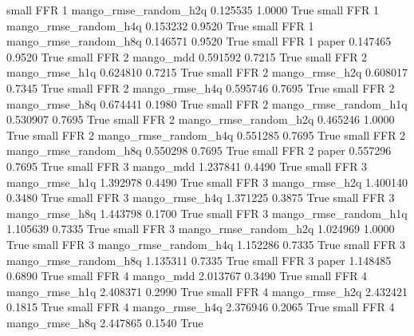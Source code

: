      small      FFR                 1 mango_rmse_random_h2q   0.125535      1.0000    True
     small      FFR                 1 mango_rmse_random_h4q   0.153232      0.9520    True
     small      FFR                 1 mango_rmse_random_h8q   0.146571      0.9520    True
     small      FFR                 1                 paper   0.147465      0.9520    True
     small      FFR                 2             mango_mdd   0.591592      0.7215    True
     small      FFR                 2        mango_rmse_h1q   0.624810      0.7215    True
     small      FFR                 2        mango_rmse_h2q   0.608017      0.7345    True
     small      FFR                 2        mango_rmse_h4q   0.595746      0.7695    True
     small      FFR                 2        mango_rmse_h8q   0.674441      0.1980    True
     small      FFR                 2 mango_rmse_random_h1q   0.530907      0.7695    True
     small      FFR                 2 mango_rmse_random_h2q   0.465246      1.0000    True
     small      FFR                 2 mango_rmse_random_h4q   0.551285      0.7695    True
     small      FFR                 2 mango_rmse_random_h8q   0.550298      0.7695    True
     small      FFR                 2                 paper   0.557296      0.7695    True
     small      FFR                 3             mango_mdd   1.237841      0.4490    True
     small      FFR                 3        mango_rmse_h1q   1.392978      0.4490    True
     small      FFR                 3        mango_rmse_h2q   1.400140      0.3480    True
     small      FFR                 3        mango_rmse_h4q   1.371225      0.3875    True
     small      FFR                 3        mango_rmse_h8q   1.443798      0.1700    True
     small      FFR                 3 mango_rmse_random_h1q   1.105639      0.7335    True
     small      FFR                 3 mango_rmse_random_h2q   1.024969      1.0000    True
     small      FFR                 3 mango_rmse_random_h4q   1.152286      0.7335    True
     small      FFR                 3 mango_rmse_random_h8q   1.135311      0.7335    True
     small      FFR                 3                 paper   1.148485      0.6890    True
     small      FFR                 4             mango_mdd   2.013767      0.3490    True
     small      FFR                 4        mango_rmse_h1q   2.408371      0.2990    True
     small      FFR                 4        mango_rmse_h2q   2.432421      0.1815    True
     small      FFR                 4        mango_rmse_h4q   2.376946      0.2065    True
     small      FFR                 4        mango_rmse_h8q   2.447865      0.1540    True
